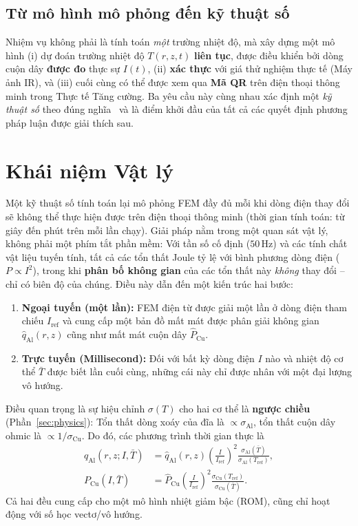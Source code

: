 \documentclass[a4paper, 10pt, conference]{ieeeconf}
\theoremstyle{remark}
\begin{document}
\subsection{Từ mô hình mô phỏng đến kỹ thuật số}
Nhiệm vụ không phải là tính toán \emph{một} trường nhiệt độ, mà xây dựng một mô hình
(i) dự đoán trường nhiệt độ $T(r,z,t)$ \textbf{liên tục}, được điều khiển bởi dòng
cuộn dây \textbf{được đo} thực sự $I(t)$, (ii) \textbf{xác thực} với giá thử nghiệm
thực tế (Máy ảnh IR), và (iii) cuối cùng có thể được xem qua \textbf{Mã QR} trên
điện thoại thông minh trong Thực tế Tăng cường. Ba yêu cầu này cùng nhau xác định
một \emph{kỹ thuật số} theo đúng nghĩa~\cite{tao2019digitaltwin} và là điểm khởi
đầu của tất cả các quyết định phương pháp luận được giải thích sau.


\section{Khái niệm Vật lý}
\label{sec:concept}

Một kỹ thuật số tính toán lại mô phỏng FEM đầy đủ mỗi khi dòng điện thay đổi sẽ
không thể thực hiện được trên điện thoại thông minh (thời gian tính toán: từ giây
đến phút trên mỗi lần chạy). Giải pháp nằm trong một quan sát vật lý, không phải
một phím tắt phần mềm: Với tần số cố định ($50\,\mathrm{Hz}$) và các tính chất vật
liệu tuyến tính, tất cả các tổn thất Joule tỷ lệ với bình phương dòng điện
($P\propto I^2$), trong khi \textbf{phân bố không gian} của các tổn thất này
\emph{không} thay đổi -- chỉ có biên độ của chúng. Điều này dẫn đến một kiến trúc
hai bước:

\begin{enumerate}[nosep]
  \item \textbf{Ngoại tuyến (một lần):} FEM điện từ được giải một lần ở dòng điện
        tham chiếu $I_{\mathrm{ref}}$ và cung cấp một bản đồ mất mát được phân giải
        không gian $\hat q_{\mathrm{Al}}(r,z)$ cũng như mất mát cuộn dây
        $\hat P_{\mathrm{Cu}}$.
  \item \textbf{Trực tuyến (Millisecond):} Đối với bất kỳ dòng điện $I$ nào và
        nhiệt độ cơ thể $\bar T$ được biết lần cuối cùng, những cái này chỉ được
        nhân với một đại lượng vô hướng.
\end{enumerate}

Điều quan trọng là sự hiệu chỉnh $\sigma(T)$ cho hai cơ thể là \textbf{ngược chiều}
(Phần~\ref{sec:physics}): Tổn thất dòng xoáy của đĩa là $\propto\sigma_{\mathrm{Al}}$,
tổn thất cuộn dây ohmic là $\propto1/\sigma_{\mathrm{Cu}}$. Do đó, các phương trình
thời gian thực là
\begin{align}
  q_{\mathrm{Al}}(r,z;I,\bar T) &= \hat q_{\mathrm{Al}}(r,z)
     \left(\frac{I}{I_{\mathrm{ref}}}\right)^{\!2}
     \frac{\sigma_{\mathrm{Al}}(\bar T)}{\sigma_{\mathrm{Al}}(T_{\mathrm{ref}})},
     \label{eq:realtime}\\[2pt]
  P_{\mathrm{Cu}}(I,\bar T) &= \hat P_{\mathrm{Cu}}
     \left(\frac{I}{I_{\mathrm{ref}}}\right)^{\!2}
     \frac{\sigma_{\mathrm{Cu}}(T_{\mathrm{ref}})}{\sigma_{\mathrm{Cu}}(\bar T)}.
     \label{eq:realtime_coil}
\end{align}
Cả hai đều cung cấp cho một mô hình nhiệt giảm bậc (ROM), cũng chỉ hoạt động với
số học vectơ/vô hướng.
\end{document}
